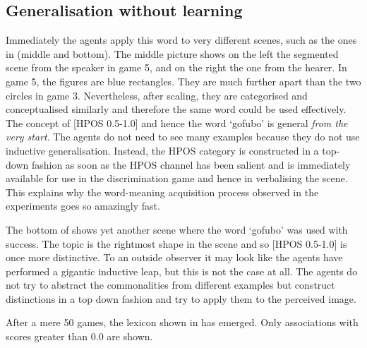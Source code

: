 \subsection{Generalisation without learning}

Immediately the agents apply this word to very 
different scenes, such as the ones in  (middle and bottom). The middle picture
shows on the left the segmented scene
from the speaker in game 5, and on the right the one
from the hearer. In game 5, the figures are blue
rectangles. They are much further apart than 
the two circles in game 3. Nevertheless, 
after scaling, they are categorised and
conceptualised similarly and therefore
the same word could be used effectively. The concept 
of [HPOS 0.5-1.0] and hence the word `gofubo' 
is general {\itshape from the very start}. 
The agents do not need to see many examples because they do 
not use inductive generalisation. Instead, 
the HPOS category is constructed in a top-down fashion 
as soon as the HPOS channel has been salient
and is immediately available for use in the 
discrimination game and hence in verbalising 
the scene. This explains why the word-meaning acquisition
process observed in the experiments goes so 
amazingly fast.

The bottom of 
shows yet another scene where the word `gofubo' 
was used with success. The topic is the rightmost
shape in the scene and so [HPOS 0.5-1.0] is once more 
distinctive. To an outside observer it may look 
like the agents have performed a gigantic inductive
leap, but this is not the case at all. The agents
do not try to abstract the commonalities from 
different examples but construct distinctions in a top 
down fashion and try to apply them to the perceived image. 

After a mere 50 games, the lexicon shown in  has emerged. Only
associations with scores greater than 0.0 are shown. 

